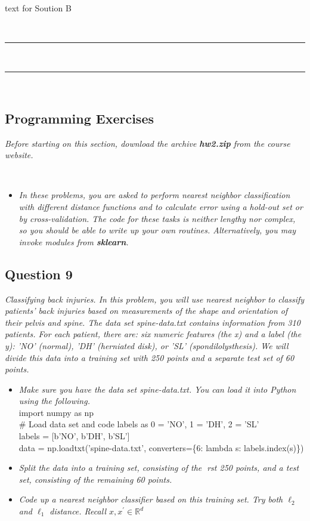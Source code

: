 \documentclass{article}
\begin{document}
\parbox{\textwidth}{text for Soution B}\\

\noindent\rule{\textwidth}{0.4pt}\\

\noindent\rule{\textwidth}{0.4pt}\\


\newpage

\subsection*{Programming Exercises}

\parbox{\textwidth}{\textit{Before starting on this section, download the archive \textbf{hw2.zip} from the course website.}}\\
\begin{itemize}
    \item \textit{In these problems, you are asked to perform nearest neighbor classification with different distance functions and to calculate error using a hold-out set or by cross-validation. The code for these tasks is neither lengthy nor complex, so you should be able to write up your own routines. Alternatively, you may invoke modules from \textbf{sklearn}.}
\end{itemize}

\parbox{\textwidth}{}

\subsection*{Question 9}

\textit{Classifying back injuries. In this problem, you will use nearest neighbor to classify patients' back
injuries based on measurements of the shape and orientation of their pelvis and spine.
The data set spine-data.txt contains information from 310 patients. For each patient, there are:
six numeric features (the x) and a label (the y): 'NO' (normal), 'DH' (herniated disk), or 'SL'
(spondilolysthesis). We will divide this data into a training set with 250 points and a separate test set
of 60 points.}

\begin{itemize}
    \item \textit{Make sure you have the data set spine-data.txt. You can load it into Python using the following.}\\
    import numpy as np\\
    \# Load data set and code labels as 0 = 'NO', 1 = 'DH', 2 = 'SL'\\
    labels = [b'NO', b'DH', b'SL']\\
    data = np.loadtxt('spine-data.txt', converters=\{6: lambda s: labels.index(s)\})\\
    \item \textit{Split the data into a training set, consisting of the rst 250 points, and a test set, consisting of
the remaining 60 points.}
    \item \textit{Code up a nearest neighbor classifier based on this training set. Try both $\ell_2$ and $\ell_1$ distance. Recall $x, x^{\prime} \in \mathbb{R}^d$}
\end{itemize}
\end{document}
